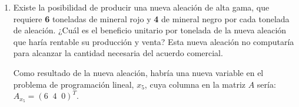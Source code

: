 \begin{enumerate}
\begin{equation}
\begin{split}
V^B = c-c^Bp^B =
\begin{pmatrix}
250 & 300 & 400 & c_{x_4} & 0 & 0\\
\end{pmatrix}
 - \begin{pmatrix}
c_{x_4} & 300 & 400\\
\end{pmatrix}
\begin{pmatrix}
6 & 0 & 0 & 1 & 1 & 8\\
1/2 & 1 & 0 & 0 & 0 & 3/2\\
-1/2 & 0 & 1 & 0 & 0 & -5/2\\
\end{pmatrix} =
\\
\begin{pmatrix}
250 & 300 & 400 & c_{x_4} & 0 & 0\\
\end{pmatrix}
-
\begin{pmatrix}
 6c_{x_4} -50 &  300 &  400 & c_{x_4} & c_{x_4} & 8c_{x_4} - 550\\
\end{pmatrix} =
\\
=
\begin{pmatrix}
 300 - 6c_{x_4} & 0 &  0 &  0 & 0 & -c_{x_4} & 550 - 8c_{x_4}\\
\end{pmatrix}
\leq 0
\end{split} 
\end{equation}

Para ello, se debe cumplir que $300 - 6c_{x_4} \leq 0$, $-c_{x_4} \leq 0$ y $650 - 8c_{x_4}$, es decir,  $c_{x_4} \geq 50$, $c_{x_4} \geq 0$ y $c_{x_4} \geq 68.75$

Siempre que se obtenga un de beneficio superior a 68.75 euros con la venta del mineral rojo, será mantendrá la gama de productos del plan de producción.


\item Existe la posibilidad de producir una nueva aleación de alta gama, que requiere \textbf{6} toneladas de mineral rojo y \textbf{4} de mineral negro por cada tonelada de aleación. ¿Cuál es el beneficio unitario por tonelada de la nueva aleación que haría rentable su producción y venta? Esta nueva aleación no computaría para alcanzar la cantidad necesaria del acuerdo comercial.

Como resultado de la nueva aleación, habría una nueva variable en el problema de programación lineal, $x_5$, cuya columna en la matriz $A$ sería: $A_{x_5} = (6\;\; 4 \;\; 0)^T$.


\end{enumerate}
